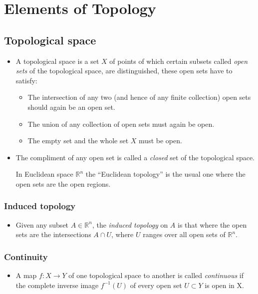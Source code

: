 \documentclass[11pt]{article}
\numberwithin{equation}{section}
\DeclareRobustCommand{\RR}{\mathbb{R}}
\begin{document}
\newpage 
\section{Elements of Topology}
\subsection{Topological space}
\begin{itemize}
  \item A topological space is a set $X$ of points of which certain subsets called \emph{open sets} of the topological space, are distinguished, these open sets have to satisfy: 
  \begin{itemize}
    \item The intersection of any two (and hence of any finite collection) open sets should again be an open set.
    \item The union of any collection of open sets must again be open. 
    \item The empty set and the whole set $X$ must be open.
  \end{itemize}

  \item The compliment of any open  set is called a \emph{closed} set of the topological space. 

  In Euclidean space $\RR^n$ the ``Euclidean topology'' is the usual one where the open sets are the open regions. 
\end{itemize}
  \subsubsection{Induced topology} 
  \begin{itemize}
    \item Given any subset $A \in \RR^n$, the \emph{induced topology} on $A$ is that where the open sets are the intersections $A \cap U$, where $U$ ranges over all open sets of $\RR^{n}$. 
  \end{itemize}
\subsubsection{Continuity}
\begin{itemize}
  \item A map $f: X \rightarrow Y$ of one topological space to another is called \emph{continuous} if the complete inverse image $f^{-1}(U)$ of every open set $U \subset Y$ is open in X. 
\end{itemize}
\end{document}

